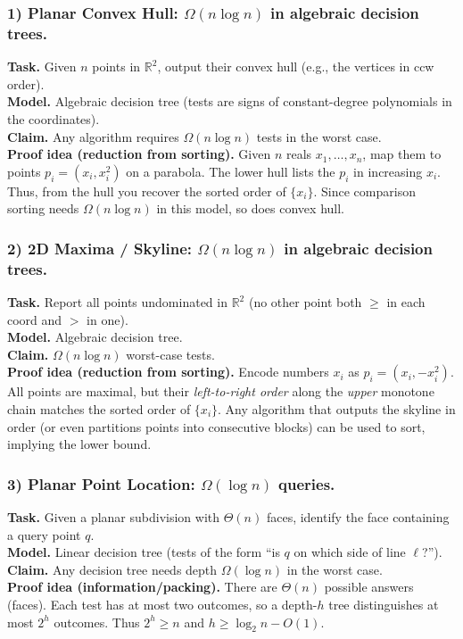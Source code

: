 \documentclass[9pt]{extarticle}
\begin{document}
\subsubsection{1) Planar Convex Hull: $\Omega(n\log n)$ in algebraic decision trees.}
\textbf{Task.} Given $n$ points in $\mathbb{R}^2$, output their convex hull (e.g., the vertices in ccw order).\\
\textbf{Model.} Algebraic decision tree (tests are signs of constant-degree polynomials in the coordinates).\\
\textbf{Claim.} Any algorithm requires $\Omega(n\log n)$ tests in the worst case.\\
\textbf{Proof idea (reduction from sorting).} Given $n$ reals $x_1,\dots,x_n$, map them to points $p_i=(x_i, x_i^2)$ on a parabola. The lower hull lists the $p_i$ in increasing $x_i$. Thus, from the hull you recover the sorted order of $\{x_i\}$. Since comparison sorting needs $\Omega(n\log n)$ in this model, so does convex hull.

\subsubsection{2) 2D Maxima / Skyline: $\Omega(n\log n)$ in algebraic decision trees.}
\textbf{Task.} Report all points undominated in $\mathbb{R}^2$ (no other point both $\ge$ in each coord and $>$ in one).\\
\textbf{Model.} Algebraic decision tree.\\
\textbf{Claim.} $\Omega(n\log n)$ worst-case tests.\\
\textbf{Proof idea (reduction from sorting).} Encode numbers $x_i$ as $p_i=(x_i,-x_i^2)$. All points are maximal, but their \emph{left-to-right order} along the \emph{upper} monotone chain matches the sorted order of $\{x_i\}$. Any algorithm that outputs the skyline in order (or even partitions points into consecutive blocks) can be used to sort, implying the lower bound.

\subsubsection{3) Planar Point Location: $\Omega(\log n)$ queries.}
\textbf{Task.} Given a planar subdivision with $\Theta(n)$ faces, identify the face containing a query point $q$.\\
\textbf{Model.} Linear decision tree (tests of the form “is $q$ on which side of line $\ell$?”).\\
\textbf{Claim.} Any decision tree needs depth $\Omega(\log n)$ in the worst case.\\
\textbf{Proof idea (information/packing).} There are $\Theta(n)$ possible answers (faces). Each test has at most two outcomes, so a depth-$h$ tree distinguishes at most $2^h$ outcomes. Thus $2^h\!\ge n$ and $h\ge \log_2 n - O(1)$.
\end{document}
